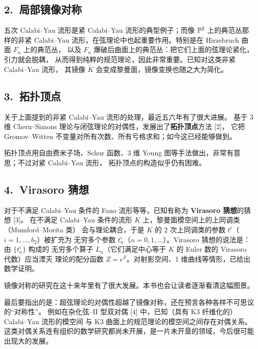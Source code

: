 \subsection*{2.\ 局部镜像对称}

五次 Calabi--Yau 流形是紧 Calabi--Yau 流形的典型例子；而像 $\mathbb{P}^2$ 上的典范丛那样的非紧
Calabi--Yau 流形，在弦理论中也起重要作用。特别是在 Hirzebruch 曲面 $F_n$ 上的典范丛，
以及 $F_n$ 爆破后曲面上的典范丛：把它们上面的弦理论紧化，引力就会脱耦，
从而得到纯粹的规范理论，因此非常重要。已知对这类非紧 Calabi--Yau 流形，
其镜像 $\tilde K$ 会变成黎曼面，镜像变换也随之大为简化。

\subsection*{3.\ 拓扑顶点}

关于上面提到的非紧 Calabi--Yau 流形的处理，最近五六年有了很大进展。
基于 3 维 Chern--Simons 理论与闭弦理论的对偶性，发展出了\textbf{拓扑顶点}方法 [2]，
它把 Gromov--Witten 不变量对所有次数、所有亏格求和；如今这已经能够做到。

拓扑顶点用自由费米子场、Schur 函数、3 维 Young 图等手法做出，非常有意思；不过对紧 Calabi--Yau 流形，
拓扑顶点的构造似乎仍有困难。

\subsection*{4.\ Virasoro 猜想}

对于不满足 Calabi--Yau 条件的 Fano 流形等等，已知有称为 \textbf{Virasoro 猜想}的猜想 [3]。
在不满足 Calabi--Yau 条件的流形 $K$ 上，黎曼面模空间上的上同调类（Mumford--Morita 类）
会与理论耦合，于是 $K$ 的 2 次上同调类的参数 $t^{i}$（$i=1,\dots,b_2$）被扩充为
无穷多个参数 $t_n^{i}$（$n=0,1,\dots$）。Virasoro 猜想的说法是：由 $\{t_n^{i}\}$ 构成的
无穷多个算子 $L_n$（它们满足中心等于 $K$ 的 Euler 数的 Virasoro 代数）应当湮灭
理论的配分函数 $Z=e^{F}$。对射影空间、1 维曲线等情形，已给出数学证明。

镜像对称的研究在这十来年里有了很大发展。本书也会让读者逐渐看清这幅图景。

最后要指出的是：超弦理论的对偶性超越了镜像对称，还在预言各种各样不可思议的“对称性”。
例如在杂化弦--II 型双对偶 [4] 中，已知（具有 K3 纤维化的）Calabi--Yau 流形的模空间
与 K3 曲面上的规范理论的模空间之间存在对偶关系。这类对偶关系连有组织的数学研究都尚未开展，是一片未开垦的领域，今后很可能出现大的发展。

